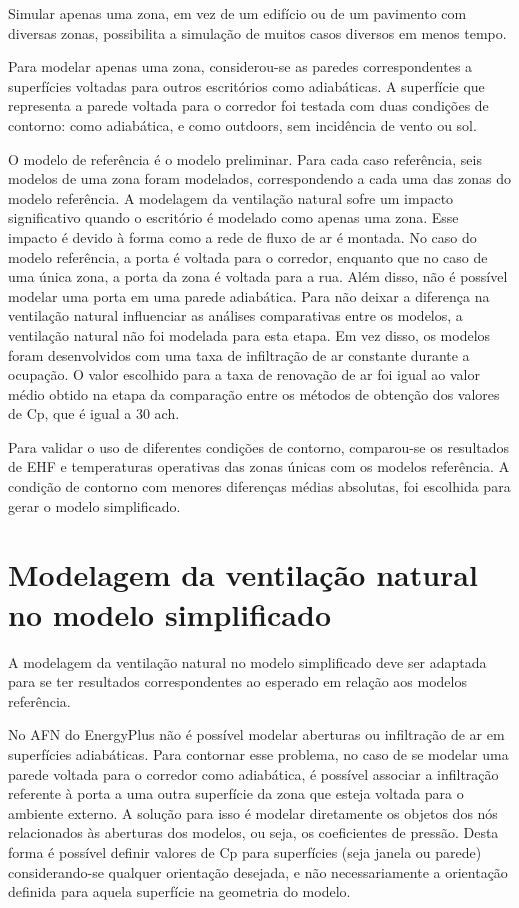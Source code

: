 \documentclass[brazil,hardcopy,openany,a5paper]{ufscthesis}
\begin{document}
		Simular apenas uma zona, em vez de um edifício ou de um pavimento com diversas zonas, possibilita a simulação de muitos casos diversos em menos tempo.
		
		Para modelar apenas uma zona, considerou-se as paredes correspondentes a superfícies voltadas para outros escritórios como adiabáticas. A superfície que representa a parede voltada para o corredor foi testada com duas condições de contorno: como adiabática, e como outdoors, sem incidência de vento ou sol.
		
		O modelo de referência é o modelo preliminar. Para cada caso referência, seis modelos de uma zona foram modelados, correspondendo a cada uma das zonas do modelo referência. A modelagem da ventilação natural sofre um impacto significativo quando o escritório é modelado como apenas uma zona. Esse impacto é devido à forma como a rede de fluxo de ar é montada. No caso do modelo referência, a porta é voltada para o corredor, enquanto que no caso de uma única zona, a porta da zona é voltada para a rua. Além disso, não é possível modelar uma porta em uma parede adiabática. Para não deixar a diferença na ventilação natural influenciar as análises comparativas entre os modelos, a ventilação natural não foi modelada para esta etapa. Em vez disso, os modelos foram desenvolvidos com uma taxa de infiltração de ar constante durante a ocupação. O valor escolhido para a taxa de renovação de ar foi igual ao valor médio obtido na etapa da comparação entre os métodos de obtenção dos valores de Cp, que é igual a 30 ach.
		
		Para validar o uso de diferentes condições de contorno, comparou-se os resultados de EHF e temperaturas operativas das zonas únicas com os modelos referência. A condição de contorno com menores diferenças médias absolutas, foi escolhida para gerar o modelo simplificado.
		
		\section{Modelagem da ventilação natural no modelo simplificado}
		
		A modelagem da ventilação natural no modelo simplificado deve ser adaptada para se ter resultados correspondentes ao esperado em relação aos modelos referência.
		
		No AFN do EnergyPlus não é possível modelar aberturas ou infiltração de ar em superfícies adiabáticas. Para contornar esse problema, no caso de se modelar uma parede voltada para o corredor como adiabática, é possível associar a infiltração referente à porta a uma outra superfície da zona que esteja voltada para o ambiente externo. A solução para isso é modelar diretamente os objetos dos nós relacionados às aberturas dos modelos, ou seja, os coeficientes de pressão. Desta forma é possível definir valores de Cp para superfícies (seja janela ou parede) considerando-se qualquer orientação desejada, e não necessariamente a orientação definida para aquela superfície na geometria do modelo.
		
\end{document}
